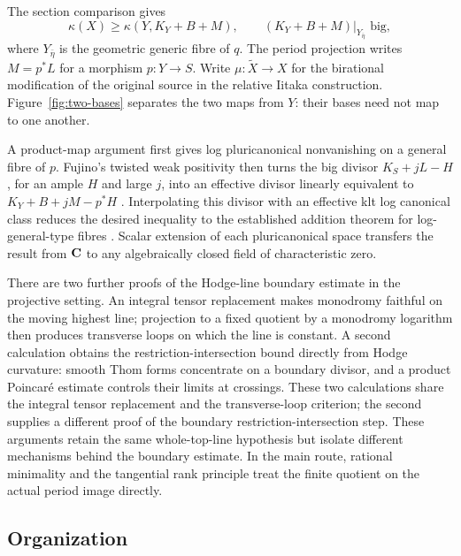 The section comparison gives
\[
 \kappa(X)\geq\kappa(Y,K_Y+B+M),\qquad
 (K_Y+B+M)|_{Y_{\bar\eta}}\text{ big},
\]
where $Y_{\bar\eta}$ is the geometric generic fibre of $q$.
The period projection writes $M=p^*L$ for a morphism $p:Y\to S$.
Write $\mu:\widetilde X\to X$ for the birational modification
of the original source in the relative Iitaka construction.
Figure~\ref{fig:two-bases} separates the two maps from $Y$: their
bases need not map to one another.



A product-map argument first gives log pluricanonical nonvanishing on a general fibre
of $p$. Fujino's twisted weak positivity then turns the big
divisor $K_S+jL-H$, for an ample $H$ and large $j$, into an
effective divisor linearly equivalent to
$K_Y+B+jM-p^*H$ \cite[Theorem~1.1]{FujinoWeakPositivity}.
Interpolating this divisor with an effective klt log canonical
class reduces the desired inequality to the established addition
theorem for log-general-type fibres
\cite[Theorem~2.11]{Hashizume}. Scalar extension of each
pluricanonical space transfers the result from $\mathbf C$ to any
algebraically closed field of characteristic zero.

There are two further proofs of the Hodge-line boundary estimate
in the projective setting. An integral tensor replacement makes
monodromy faithful on the moving highest line; projection to a
fixed quotient by a monodromy logarithm then produces transverse
loops on which the line is constant. A second calculation obtains
the restriction-intersection bound directly from Hodge curvature:
smooth Thom forms concentrate on a boundary divisor, and a product
Poincar\'e estimate controls their limits at crossings. These
two calculations share the integral tensor replacement and the
transverse-loop criterion; the second supplies a different proof
of the boundary restriction-intersection step. These
arguments retain the same whole-top-line hypothesis but isolate
different mechanisms behind the boundary estimate. In the main
route, rational minimality and the tangential rank principle treat
the finite quotient on the actual period image directly.

\subsection{Organization}

